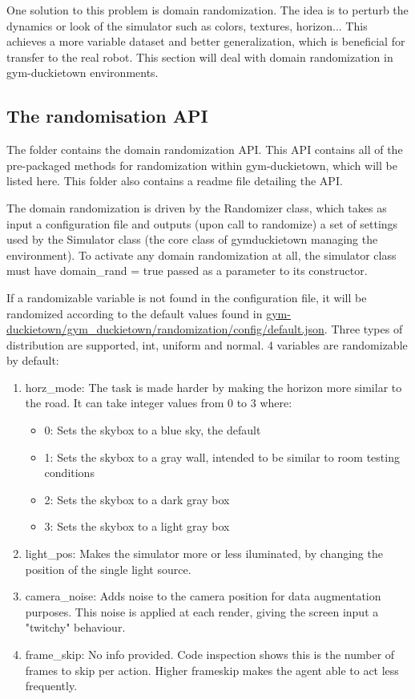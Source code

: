 One solution to this problem is domain randomization.
The idea is to perturb the dynamics or look of the simulator such as colors, textures, horizon...
This achieves a more variable dataset and better generalization, which is beneficial for transfer to the real robot.
This section will deal with domain randomization in gym-duckietown environments.

\subsection{The randomisation API}

The folder  contains the domain randomization API.
This API contains all of the pre-packaged methods for randomization within gym-duckietown, which will be listed here.
This folder also contains a readme file detailing the API.

The domain randomization is driven by the Randomizer class, which takes as input a configuration file and outputs (upon call to randomize) a set of settings used by the Simulator class (the core class of gym\-duckietown managing the environment).
To activate any domain randomization at all, the simulator class must have domain\_rand = true passed as a parameter to its constructor.

If a randomizable variable is not found in the configuration file, it will be randomized according to the default values found in \url{gym-duckietown/gym_duckietown/randomization/config/default.json}.
Three types of distribution are supported, int, uniform and normal. 4 variables are randomizable by default:
\begin{enumerate}
    \item horz\_mode: The task is made harder by making the horizon more similar to the road. It can take integer values from 0 to 3 where:
        \begin{itemize}
            \item 0: Sets the skybox to a blue sky, the default
            \item 1: Sets the skybox to a gray wall, intended to be similar to room testing conditions
            \item 2: Sets the skybox to a dark gray box
            \item 3: Sets the skybox to a light gray box
        \end{itemize}
    \item light\_pos: Makes the simulator more or less iluminated, by changing the position of the single light source.
    \item camera\_noise: Adds noise to the camera position for data augmentation purposes. This noise is applied at each render, giving the screen input a "twitchy" behaviour.
    \item frame\_skip: No info provided. Code inspection shows this is the number of frames to skip per action. Higher frameskip makes the agent able to act less frequently.
\end{enumerate}

